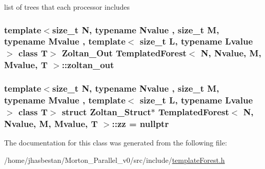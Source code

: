 \label{classTemplatedForest_af8453636607eeaa4f9594d698cf163a9}
list of trees that each processor includes \hypertarget{classTemplatedForest_a4c6cc2bddf68e03763e76377df46b42a}{
\subsubsection[{zoltan\_\-out}]{\setlength{\rightskip}{0pt plus 5cm}template$<$size\_\-t N, typename Nvalue , size\_\-t M, typename Mvalue , template$<$ size\_\-t L, typename Lvalue $>$ class T$>$ {\bf Zoltan\_\-Out} {\bf TemplatedForest}$<$ N, Nvalue, M, Mvalue, T $>$::{\bf zoltan\_\-out}}}
\label{classTemplatedForest_a4c6cc2bddf68e03763e76377df46b42a}
\hypertarget{classTemplatedForest_ad0940abd76a40dbb80c63ea322c6278b}{
\subsubsection[{zz}]{\setlength{\rightskip}{0pt plus 5cm}template$<$size\_\-t N, typename Nvalue , size\_\-t M, typename Mvalue , template$<$ size\_\-t L, typename Lvalue $>$ class T$>$ struct Zoltan\_\-Struct$\ast$ {\bf TemplatedForest}$<$ N, Nvalue, M, Mvalue, T $>$::{\bf zz} = nullptr}}
\label{classTemplatedForest_ad0940abd76a40dbb80c63ea322c6278b}


The documentation for this class was generated from the following file:\begin{DoxyCompactItemize}
\item 
/home/jhasbestan/Morton\_\-Parallel\_\-v0/src/include/\hyperlink{templateForest_8h}{templateForest.h}\end{DoxyCompactItemize}
